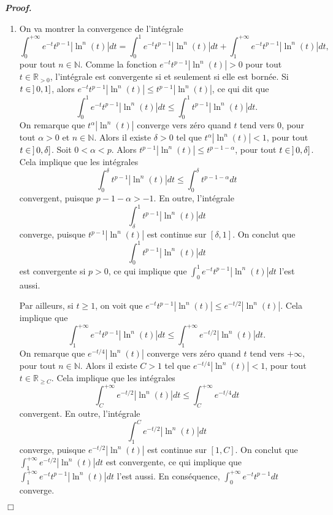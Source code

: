 \documentclass[11pt,a4paper]{article}
\newcommand{\NN}{\mathbb{N}}
\newcommand{\RR}{\mathbb{R}}
\newenvironment{preuve}[1][]
{\vskip 2mm  \noindent\emph{\bf Proof#1. }}{$\Box$ \vskip 2mm}
\let\geq\geqslant
\let\leq\leqslant
\begin{document}
	\begin{preuve}
		\begin{enumerate} 
			\item On va montrer la convergence de l'intégrale
			\[     \int_0^{+\infty} e^{-t} t^{p-1} |\ln^{n}(t)| dt = \int_0^{1} e^{-t} t^{p-1} |\ln^{n}(t)| dt + \int_{1}^{+\infty} e^{-t} t^{p-1} |\ln^{n}(t)| dt,     \]
			pour tout $n \in \NN$. 
			Comme la fonction $e^{-t} t^{p-1} |\ln^{n}(t)| > 0$ pour tout $t \in \RR_{>0}$, l'intégrale est convergente si et seulement si elle est bornée. 
			Si $t \in \hskip0.6mm ] \hskip0.6mm 0,1]$, alors $e^{-t} t^{p-1} |\ln^{n}(t)| \leq t^{p-1} |\ln^{n}(t)|$, ce qui dit que 
			\[     \int_0^{1} e^{-t} t^{p-1} |\ln^{n}(t)| dt \leq \int_0^{1} t^{p-1} |\ln^{n}(t)| dt.     \]
			On remarque que $t^{\alpha} |\ln^{n}(t)|$ converge vers zéro quand $t$ tend vers $0$, pour tout $\alpha > 0$ et $n \in \NN$. 
			Alors il existe $\delta > 0$ tel que $t^{\alpha} |\ln^{n}(t)| < 1$, pour tout $t \in \hskip 0.6 mm ] \hskip 0.6 mm 0,\delta]$. 
			Soit $0 < \alpha < p$. 
			Alors $t^{p-1} |\ln^{n}(t)| \leq t^{p-1-\alpha}$, pour tout $t \in \hskip 0.6 mm ] \hskip 0.6 mm 0,\delta]$. 
			Cela implique que les intégrales
			\[     \int_0^{\delta} t^{p-1} |\ln^{n}(t)| dt \leq \int_0^{\delta} t^{p-1-\alpha} dt     \] 
			convergent, puisque $p-1-\alpha > -1$. 
			En outre, l'intégrale 
			\[     \int_{\delta}^{1} t^{p-1} |\ln^{n}(t)| dt     \]
			converge, puisque $t^{p-1} |\ln^{n}(t)|$ est continue sur $[\delta,1]$.
			On conclut que 
			\[     \int_0^{1} t^{p-1} |\ln^{n}(t)| dt     \]
			est convergente si $p > 0$, ce qui implique que $\int_0^{1} e^{-t} t^{p-1} |\ln^{n}(t)| dt$ l'est aussi. 
			
			Par ailleurs, si $t \geq 1$, on voit que $e^{-t} t^{p-1} |\ln^{n}(t)|  \leq e^{-t/2} |\ln^{n}(t)| $. 
			Cela implique que 
			\[     \int_{1}^{+ \infty} e^{-t} t^{p-1} |\ln^{n}(t)|  dt \leq \int_{1}^{+ \infty} e^{-t/2} |\ln^{n}(t)|  dt.     \]
			On remarque que $e^{-t/4} |\ln^{n}(t)|$ converge vers zéro quand $t$ tend vers $+ \infty$, pour tout $n \in \NN$. 
			Alors il existe $C > 1$ tel que $e^{-t/4} |\ln^{n}(t)| < 1$, pour tout $t \in \RR_{\geq C}$.
			Cela implique que les intégrales
			\[     \int_{C}^{+ \infty} e^{-t/2} |\ln^{n}(t)|  dt \leq \int_{C}^{+ \infty} e^{-t/4}  dt     \]
			convergent. 
			En outre, l'intégrale 
			\[     \int_{1}^{C} e^{-t/2} |\ln^{n}(t)| dt     \]
			converge, puisque $e^{-t/2} |\ln^{n}(t)|$ est continue sur $[1,C]$.
			On conclut que $\int_{1}^{+ \infty} e^{-t/2} |\ln^{n}(t)|  dt$ est convergente, ce qui implique que 
			$\int_{1}^{+ \infty} e^{-t} t^{p-1} |\ln^{n}(t)|  dt$ l'est aussi. 
			En conséquence, $\int_0^{+\infty} e^{-t} t^{p-1} dt$ converge. 
			

\end{enumerate}
\end{preuve}
\end{document}
